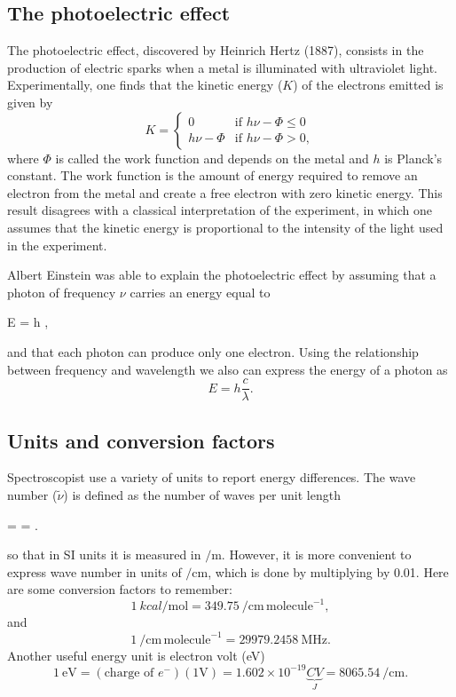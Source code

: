 \documentclass[../Main/chem331-notes.tex]{subfiles}
\begin{document}
\subsection{The photoelectric effect}
The photoelectric effect, discovered by Heinrich Hertz (1887), consists in the production of electric sparks when a metal is illuminated with ultraviolet light.
Experimentally, one finds that the kinetic energy ($K$) of the electrons emitted is given by
\begin{equation}
K = \begin{cases}
0 & \text{if } h\nu - \Phi  \leq 0 \\
h\nu - \Phi & \text{if } h\nu - \Phi  > 0,
\end{cases}
\end{equation}
where $\Phi$ is called the work function and depends on the metal and $h$ is Planck's constant.
The work function is the amount of energy required to remove an electron from the metal and create a free electron with zero kinetic energy.
This result disagrees with a classical interpretation of the experiment, in which one assumes that the kinetic energy is proportional to the intensity of the light used in the experiment.

Albert Einstein was able to explain the photoelectric effect by assuming that a photon of frequency $\nu$ carries an energy equal to
\begin{iequation}
E = h \nu,
\end{iequation}
and that each photon can produce only one electron.
Using the relationship between frequency and wavelength we also can express the energy of a photon as
\begin{equation}
E = h \frac{c}{\lambda}.
\end{equation}

\subsection{Units and conversion factors}
Spectroscopist use a variety of units to report energy differences.
The wave number ($\tilde{\nu}$) is defined as the number of waves per unit length
\begin{iequation}
\tilde{\nu} =  = .
\end{iequation}
so that in SI units it is measured in $\si{\per\meter}$. However, it is more convenient to express wave number in units of $\si{\per\centi\meter}$, which is done by multiplying by 0.01.
Here are some conversion factors to remember:
\begin{equation}
\SI{1}{kcal\per\mole} = \SI{349.75}{\per\centi\meter}\,\mathrm{molecule}^{-1},
\end{equation}
and 
\begin{equation}
\SI{1}{\per\centi\meter}\,\mathrm{molecule}^{-1} = \SI{29979.2458}{\mega\hertz}.
\end{equation}
Another useful energy unit is electron volt (eV)
\begin{equation}
\SI{1}{\electronvolt} = (\text{charge of }e^{-})(1\si{\volt})  =  1.602\times10^{-19} \underbrace{C V}_{J} 
=\SI{8065.54}{\per\centi\meter}.
\end{equation}
\end{document}
